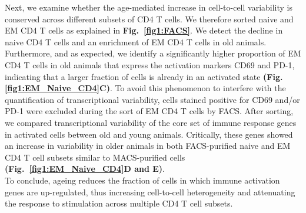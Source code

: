 Next, we examine whether the age-mediated increase in cell-to-cell variability is conserved across different subsets of CD4\plus{} T cells. We therefore sorted naive and EM CD4\plus{} T cells as explained in \textbf{Fig.~\ref{fig1:FACS}}. We detect the decline in naive CD4\plus{} T cells and an enrichment of EM CD4\plus{} T cells in old animals. Furthermore, and as expected, we identify a significantly higher proportion of EM CD4\plus{} T cells in old animals that express the activation markers CD69 and PD-1, indicating that a larger fraction of cells is already in an activated state \textbf{(Fig. \ref{fig1:EM_Naive_CD4}C)}. To avoid this phenomenon to interfere with the quantification of transcriptional variability, cells stained positive for CD69 and/or PD-1 were excluded during the sort of EM CD4\plus{} T cells by FACS. After sorting, we compared transcriptional variability of the core set of immune response genes in activated cells between old and young animals. Critically, these genes showed an increase in variability in older animals in both FACS-purified naive and EM CD4\plus{} T cell subsets similar to MACS-purified cells  \textbf{(Fig.~\ref{fig1:EM_Naive_CD4}D and E)}.\\

To conclude, ageing reduces the fraction of cells in which immune activation genes are up-regulated, thus increasing cell-to-cell heterogeneity and attenuating the response to stimulation across multiple CD4\plus{} T cell subsets.

\newpage

